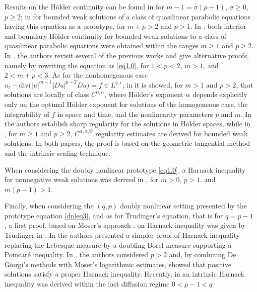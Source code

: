 \documentclass[a4paper,11pt,fullpage]{article}
\numberwithin{equation}{section}
\begin{document}
\noindent Results on the H\"older continuity can be found in \cite{Iv1} for $m-1=\sigma(p-1)$, $\sigma \geqslant 0$, $p\geqslant 2$; in \cite{Vesp92} for bounded weak solutions of a class of quasilinear parabolic equations having this equation as a prototype, for $m+p >2$ and $p>1$. In \cite{PoVe}, both interior and boundary H\"older continuity for bounded weak solutions to a class of quasilinear parabolic equations  were obtained within the ranges $m\geqslant 1$ and $p \geqslant 2$. In \cite{VeVe22}, the authors revisit several of the previous works and give alternative proofs, namely by  rewriting the equation as \eqref{eq1.0}, for $1<p<2$, $m>1$, and $2<m+p<3$. As for the nonhomegenous case $\displaystyle{u_t-\textrm{div} \big(|u|^{m-1} |Du|^{p-2} Du\big)=f\in L^{q,r} }$,	
in \cite{Araujo20} it is showed, for $m>1$ and $p>2$, that solutions are locally of class $C^{0,\alpha}$,  where H\"older's exponent $\alpha$ depends explicitly only on the optimal H\"older exponent for solutions of the homogeneous case, the integrability of $f$ in space and time, and the nonlinearity parameters $p$ and $m$. In \cite{ASRS23} the authors establish sharp regularity for the solutions in H\"older spaces, while in \cite{JSR22}, for $m\geqslant 1$ and $p \geqslant 2$, $C^{\alpha, \alpha/\theta}$ regularity estimates are derived for bounded weak solutions. In both papers, the proof is based on the geometric tangential method and the intrinsic scaling technique. 


\vspace{.1cm}

When considering the doubly nonlinear prototype \eqref{eq1.0}, a Harnack inequality for nonnegative weak solutions was derived in \cite{BHSS21}, for $m> 0$, $p>1$, and $m(p-1)>1$. 

\vspace{.1cm}

Finally, when considering the $(q,p)$ doubly nonlinear setting presented by the prototype equation \eqref{dnleq3},
and as for Trudinger's equation, that is for $q=p-1$, a first proof, based on Moser's approach \cite{M64}, on Harnack inequality was given by Trudinger in \cite{T68}. In \cite{KiKu} the authors presented a simpler proof of Harnack inequality replacing the Lebesque measure by  a doubling Borel measure supporting a Poincar\'e inequality. In \cite{GiVe}, the authors considered $p>2$ and, by combining De Giorgi's methods with Moser's logarithmic estimates, showed that positive solutions satisfy a proper Harnack inequality. Recently, in \cite{BDGLS26} an intrinsic Harnack inequality was derived within the fast diffusion regime $0<p-1<q$.
\end{document}

